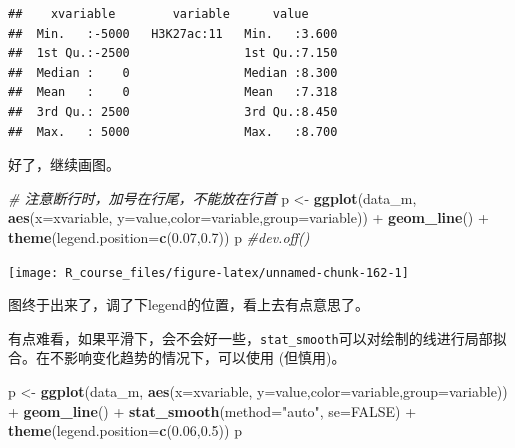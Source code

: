 \documentclass[]{article}
\newenvironment{Shaded}{\begin{snugshade}}{\end{snugshade}}
\newcommand{\KeywordTok}[1]{\textcolor[rgb]{0.13,0.29,0.53}{\textbf{{#1}}}}
\newcommand{\DataTypeTok}[1]{\textcolor[rgb]{0.13,0.29,0.53}{{#1}}}
\newcommand{\FloatTok}[1]{\textcolor[rgb]{0.00,0.00,0.81}{{#1}}}
\newcommand{\StringTok}[1]{\textcolor[rgb]{0.31,0.60,0.02}{{#1}}}
\newcommand{\CommentTok}[1]{\textcolor[rgb]{0.56,0.35,0.01}{\textit{{#1}}}}
\newcommand{\OtherTok}[1]{\textcolor[rgb]{0.56,0.35,0.01}{{#1}}}
\newcommand{\NormalTok}[1]{{#1}}
\numberwithin{figure}{section}
\numberwithin{table}{section}
\theoremstyle{definition}
\theoremstyle{definition}
\theoremstyle{definition}
\theoremstyle{remark}
\begin{document}
\begin{verbatim}
##    xvariable        variable      value      
##  Min.   :-5000   H3K27ac:11   Min.   :3.600  
##  1st Qu.:-2500                1st Qu.:7.150  
##  Median :    0                Median :8.300  
##  Mean   :    0                Mean   :7.318  
##  3rd Qu.: 2500                3rd Qu.:8.450  
##  Max.   : 5000                Max.   :8.700
\end{verbatim}

好了，继续画图。

\begin{Shaded}
\begin{Highlighting}[]
\CommentTok{# 注意断行时，加号在行尾，不能放在行首}
\NormalTok{p <-}\StringTok{ }\KeywordTok{ggplot}\NormalTok{(data_m, }\KeywordTok{aes}\NormalTok{(}\DataTypeTok{x=}\NormalTok{xvariable, }\DataTypeTok{y=}\NormalTok{value,}\DataTypeTok{color=}\NormalTok{variable,}\DataTypeTok{group=}\NormalTok{variable)) +}
\StringTok{     }\KeywordTok{geom_line}\NormalTok{() +}\StringTok{ }\KeywordTok{theme}\NormalTok{(}\DataTypeTok{legend.position=}\KeywordTok{c}\NormalTok{(}\FloatTok{0.07}\NormalTok{,}\FloatTok{0.7}\NormalTok{))}
\NormalTok{p}
\CommentTok{#dev.off()}
\end{Highlighting}
\end{Shaded}

\begin{center}\texttt{[image: R\_course\_files/figure-latex/unnamed-chunk-162-1]} \end{center}

图终于出来了，调了下legend的位置，看上去有点意思了。

有点难看，如果平滑下，会不会好一些，\texttt{stat\_smooth}可以对绘制的线进行局部拟合。在不影响变化趋势的情况下，可以使用
(但慎用)。

\begin{Shaded}
\begin{Highlighting}[]
\NormalTok{p <-}\StringTok{ }\KeywordTok{ggplot}\NormalTok{(data_m, }\KeywordTok{aes}\NormalTok{(}\DataTypeTok{x=}\NormalTok{xvariable, }\DataTypeTok{y=}\NormalTok{value,}\DataTypeTok{color=}\NormalTok{variable,}\DataTypeTok{group=}\NormalTok{variable)) +}\StringTok{ }
\StringTok{     }\KeywordTok{geom_line}\NormalTok{() +}\StringTok{ }\KeywordTok{stat_smooth}\NormalTok{(}\DataTypeTok{method=}\StringTok{"auto"}\NormalTok{, }\DataTypeTok{se=}\OtherTok{FALSE}\NormalTok{) +}\StringTok{ }
\StringTok{     }\KeywordTok{theme}\NormalTok{(}\DataTypeTok{legend.position=}\KeywordTok{c}\NormalTok{(}\FloatTok{0.06}\NormalTok{,}\FloatTok{0.5}\NormalTok{))}
\NormalTok{p}
\end{Highlighting}
\end{Shaded}
\end{document}
